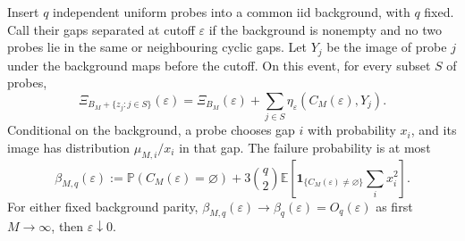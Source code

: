 \documentclass[11pt,letterpaper]{article}
\newcommand{\PP}{\mathbb P}\newcommand{\EE}{\mathbb E}
\newcommand{\ind}{\mathbf 1}\newcommand{\Exp}{\operatorname{Exp}}
\begin{document}
\begin{lemma}
\label{lem:separated-insertions}
Insert $q$ independent uniform probes into a common iid background,
with $q$ fixed. Call their gaps separated at cutoff $\varepsilon$ if
the background is nonempty and no two probes lie in the same or
neighbouring cyclic gaps. Let $Y_j$ be the image of probe $j$ under
the background maps before the cutoff. On this event, for every
subset $S$ of probes,
\begin{equation}\label{eq:isolated-readout}
 \Xi_{B_M+\{z_j:j\in S\}}(\varepsilon)
   =\Xi_{B_M}(\varepsilon)
      +\sum_{j\in S}\eta_\varepsilon(C_M(\varepsilon),Y_j).
\end{equation}
Conditional on the background, a probe chooses gap $i$ with probability
$x_i$, and its image has distribution $\mu_{M,i}/x_i$ in that gap.
The failure probability is at most
\begin{equation}\label{eq:gap-isolation-error}
 \beta_{M,q}(\varepsilon):=
 \PP(C_M(\varepsilon)=\varnothing)
 +3\binom q2\EE\!\left[
   \ind_{\{C_M(\varepsilon)\ne\varnothing\}}\sum_i x_i^2\right].
\end{equation}
For either fixed background parity,
$\beta_{M,q}(\varepsilon)\to\beta_q(\varepsilon)=O_q(\varepsilon)$
as first $M\to\infty$, then $\varepsilon\downarrow0$.
\end{lemma}
\end{document}
